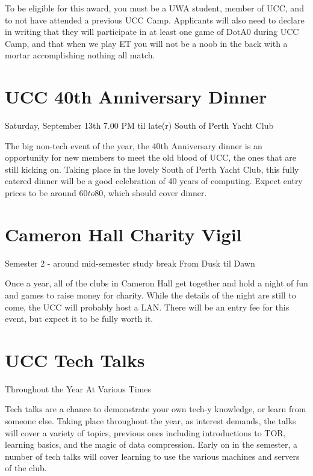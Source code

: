 To be eligible for this award, you must be a UWA student, member of
UCC, and to not have attended a previous UCC Camp. Applicants will
also need to declare in writing that they will participate in at least
one game of DotA0 during UCC Camp, and that when we play ET you will
not be a noob in the back with a mortar accomplishing nothing all
match.

\section{UCC 40th Anniversary Dinner}
Saturday, September 13th
7.00 PM til late(r)
South of Perth Yacht Club

The big non-tech event of the year, the 40th Anniversary dinner is an opportunity for new members to meet the old blood of UCC, the ones that are still kicking on. Taking place in the lovely South of Perth Yacht Club, this fully catered dinner will be a good celebration of 40 years of computing. Expect entry prices to be around $60 to $80, which should cover dinner.

\section{Cameron Hall Charity Vigil}
Semester 2 - around mid-semester study break
From Dusk til Dawn

Once a year, all of the clubs in Cameron Hall get together and hold a night of fun and games to raise money for charity. While the details of the night are still to come, the UCC will probably host a LAN. There will be an entry fee for this event, but expect it to be fully worth it.

\section{UCC Tech Talks}
Throughout the Year
At Various Times

Tech talks are a chance to demonstrate your own tech-y knowledge, or learn from someone else. Taking place throughout the year, as interest demands, the talks will cover a variety of topics, previous ones including introductions to TOR, learning basics, and the magic of data compression. Early on in the semester, a number of tech talks will cover learning to use the various machines and servers of the club. 
